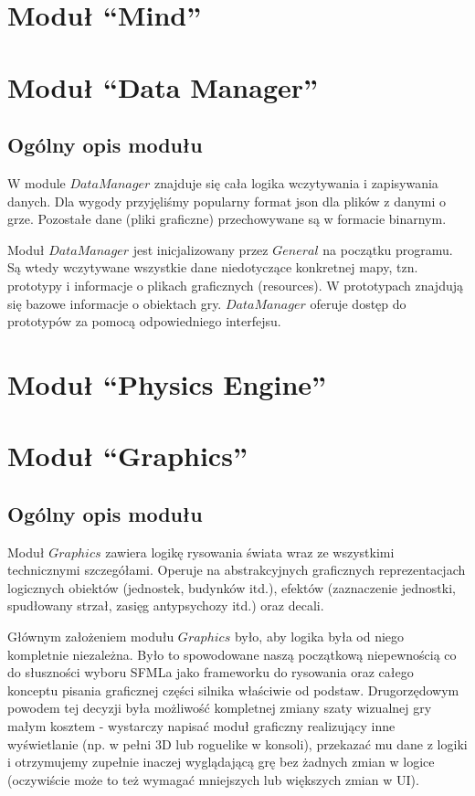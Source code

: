 \documentclass[licencjacka]{pracamgr}
\begin{document}
  \section{Moduł ``Mind''}

  \section{Moduł ``Data Manager''}
    \subsection{Ogólny opis modułu}
      W module $DataManager$ znajduje się cała logika wczytywania i zapisywania danych. Dla wygody przyjęliśmy
      popularny format json dla plików z danymi o grze. Pozostałe dane (pliki graficzne) przechowywane są w formacie
      binarnym.

      Moduł $DataManager$ jest inicjalizowany przez $General$ na początku programu. Są wtedy wczytywane wszystkie dane
      niedotyczące konkretnej mapy, tzn. prototypy i informacje o plikach graficznych (resources). W prototypach
      znajdują się bazowe informacje o obiektach gry. $DataManager$ oferuje dostęp do prototypów za pomocą
      odpowiedniego interfejsu.

  \section{Moduł ``Physics Engine''}
  \section{Moduł ``Graphics''}
    \subsection{Ogólny opis modułu}
      Moduł $Graphics$ zawiera logikę rysowania świata wraz ze wszystkimi technicznymi szczegółami. Operuje na
      abstrakcyjnych graficznych reprezentacjach logicznych obiektów (jednostek, budynków itd.), efektów (zaznaczenie
      jednostki, spudłowany strzał, zasięg antypsychozy itd.) oraz decali.

      Głównym założeniem modułu $Graphics$ było, aby logika była od niego kompletnie niezależna. Było to spowodowane
      naszą początkową niepewnością co do słuszności wyboru SFMLa jako frameworku do rysowania oraz całego konceptu
      pisania graficznej części silnika właściwie od podstaw. Drugorzędowym powodem tej decyzji była możliwość
      kompletnej zmiany szaty wizualnej gry małym kosztem - wystarczy napisać moduł graficzny realizujący inne
      wyświetlanie (np. w pełni 3D lub roguelike w konsoli), przekazać mu dane z logiki i otrzymujemy zupełnie inaczej
      wyglądającą grę bez żadnych zmian w logice (oczywiście może to też wymagać mniejszych lub większych zmian w UI).
\end{document}
